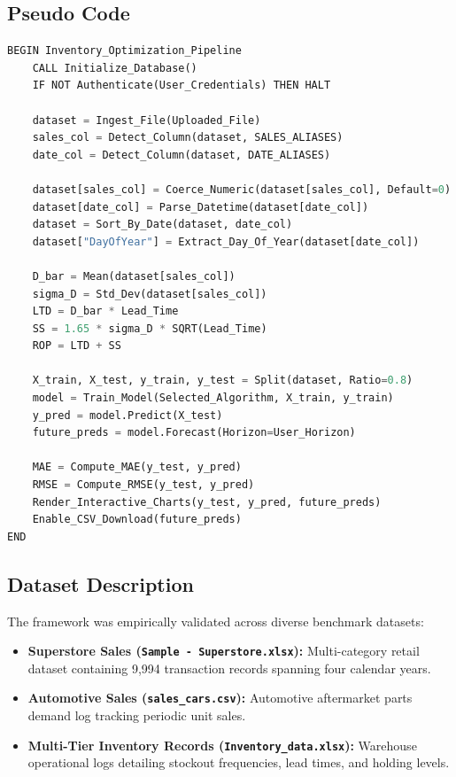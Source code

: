 \documentclass[12pt,a4paper]{report}
\begin{document}
\subsection{Pseudo Code}
\begin{lstlisting}[language=Python]
BEGIN Inventory_Optimization_Pipeline
    CALL Initialize_Database()
    IF NOT Authenticate(User_Credentials) THEN HALT
    
    dataset = Ingest_File(Uploaded_File)
    sales_col = Detect_Column(dataset, SALES_ALIASES)
    date_col = Detect_Column(dataset, DATE_ALIASES)
    
    dataset[sales_col] = Coerce_Numeric(dataset[sales_col], Default=0)
    dataset[date_col] = Parse_Datetime(dataset[date_col])
    dataset = Sort_By_Date(dataset, date_col)
    dataset["DayOfYear"] = Extract_Day_Of_Year(dataset[date_col])
    
    D_bar = Mean(dataset[sales_col])
    sigma_D = Std_Dev(dataset[sales_col])
    LTD = D_bar * Lead_Time
    SS = 1.65 * sigma_D * SQRT(Lead_Time)
    ROP = LTD + SS
    
    X_train, X_test, y_train, y_test = Split(dataset, Ratio=0.8)
    model = Train_Model(Selected_Algorithm, X_train, y_train)
    y_pred = model.Predict(X_test)
    future_preds = model.Forecast(Horizon=User_Horizon)
    
    MAE = Compute_MAE(y_test, y_pred)
    RMSE = Compute_RMSE(y_test, y_pred)
    Render_Interactive_Charts(y_test, y_pred, future_preds)
    Enable_CSV_Download(future_preds)
END
\end{lstlisting}

\subsection{Dataset Description}
The framework was empirically validated across diverse benchmark datasets:
\begin{itemize}
    \item \textbf{Superstore Sales (\texttt{Sample - Superstore.xlsx}):} Multi-category retail dataset containing 9,994 transaction records spanning four calendar years.
    \item \textbf{Automotive Sales (\texttt{sales\_cars.csv}):} Automotive aftermarket parts demand log tracking periodic unit sales.
    \item \textbf{Multi-Tier Inventory Records (\texttt{Inventory\_data.xlsx}):} Warehouse operational logs detailing stockout frequencies, lead times, and holding levels.
\end{itemize}
\end{document}
